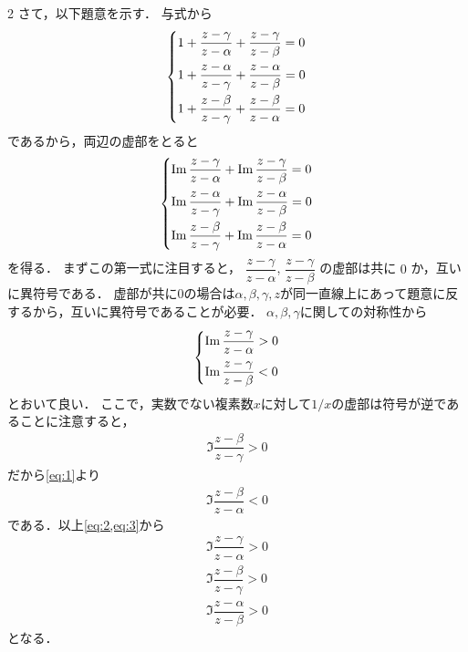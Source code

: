 \documentclass[../../main.tex]{subfiles}
\begin{document}
\begin{multicols}{2}
  さて，以下題意を示す．
  与式から
  \begin{align}
    \begin{dcases}
      1 + \dfrac{z-\gamma}{z-\alpha} + \dfrac{z-\gamma}{z-\beta} = 0 \\
      1 + \dfrac{z-\alpha}{z-\gamma} + \dfrac{z-\alpha}{z-\beta} = 0 \\
      1 + \dfrac{z-\beta}{z-\gamma} + \dfrac{z-\beta}{z-\alpha}  = 0
    \end{dcases}
  \end{align}
  であるから，両辺の虚部をとると
  \begin{align}
    \begin{dcases}
      \Im \dfrac{z-\gamma}{z-\alpha} + \Im \dfrac{z-\gamma}{z-\beta} = 0 \\
      \Im \dfrac{z-\alpha}{z-\gamma} + \Im \dfrac{z-\alpha}{z-\beta} = 0 \\
      \Im \dfrac{z-\beta}{z-\gamma} +  \Im \dfrac{z-\beta}{z-\alpha}  = 0
    \end{dcases} \label{eq:1}
  \end{align}
  を得る．
  まずこの第一式に注目すると，
  $\dfrac{z-\gamma}{z-\alpha}$, $\dfrac{z-\gamma}{z-\beta}$ の虚部は共に $0$ か，互いに異符号である．
  虚部が共に$0$の場合は$\alpha,\beta,\gamma,z$が同一直線上にあって題意に反するから，互いに異符号であることが必要．
  $\alpha,\beta,\gamma$に関しての対称性から
  \begin{align}
    \begin{dcases}
      \Im \dfrac{z-\gamma}{z-\alpha} > 0 \\
      \Im \dfrac{z-\gamma}{z-\beta} < 0
    \end{dcases} \label{eq:2}
  \end{align}
  とおいて良い．
  ここで，実数でない複素数$x$に対して$1/x$の虚部は符号が逆であることに注意すると，
  \begin{align}
    \Im \dfrac{z-\beta}{z-\gamma} > 0
  \end{align}
  だから\cref{eq:1}より
  \begin{align}
    \Im \dfrac{z-\beta}{z-\alpha} < 0  \label{eq:3}
  \end{align}
  である．以上\cref{eq:2,eq:3}から
  \begin{align}
    \Im \dfrac{z-\gamma}{z-\alpha} > 0 \\
    \Im \dfrac{z-\beta}{z-\gamma} > 0  \\
    \Im \dfrac{z-\alpha}{z-\beta} > 0
  \end{align}
  となる．


\end{multicols}
\end{document}
